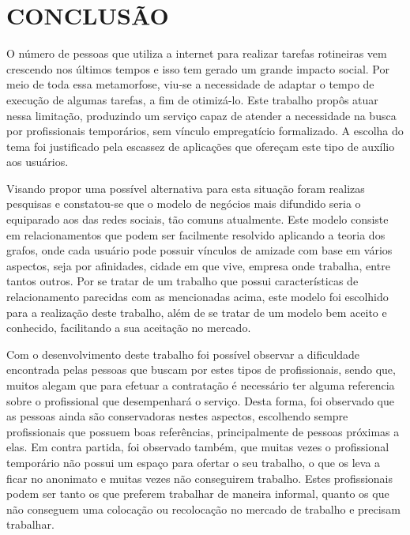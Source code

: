 \chapter{CONCLUSÃO} 


\par O número de pessoas que utiliza a internet para realizar tarefas rotineiras vem crescendo nos últimos tempos e isso tem gerado um grande impacto social. Por meio de toda essa metamorfose, viu-se a necessidade de adaptar o tempo de execução de algumas tarefas, a fim de otimizá-lo.  Este trabalho propôs atuar nessa limitação, produzindo um serviço capaz de atender a necessidade na busca por profissionais temporários, sem vínculo empregatício formalizado. A escolha do tema foi justificado pela escassez de aplicações que ofereçam este tipo de auxílio aos usuários.

\par Visando propor uma possível alternativa para esta situação foram realizas pesquisas e constatou-se que o modelo de negócios mais difundido seria o equiparado aos das redes sociais, tão comuns atualmente. Este modelo consiste em relacionamentos que podem ser facilmente resolvido aplicando a teoria dos grafos, onde cada usuário pode possuir vínculos de amizade com base em vários aspectos, seja por afinidades, cidade em que vive, empresa onde trabalha, entre tantos outros. Por se tratar de um trabalho que possui características de relacionamento parecidas com as mencionadas acima, este modelo foi escolhido para a realização deste trabalho, além de se tratar de um modelo bem aceito e conhecido, facilitando a sua aceitação no mercado.

\par Com o desenvolvimento deste trabalho foi possível observar a dificuldade encontrada pelas pessoas que buscam por estes tipos de profissionais, sendo que, muitos alegam que para efetuar a contratação é necessário ter alguma referencia sobre o profissional que desempenhará o serviço. Desta forma, foi observado que as pessoas ainda são conservadoras nestes aspectos, escolhendo sempre profissionais que possuem boas referências, principalmente de pessoas próximas a elas. Em contra partida, foi observado também, que muitas vezes o profissional temporário não possui um espaço para ofertar o seu trabalho, o que os leva a ficar no anonimato e muitas vezes não conseguirem trabalho. Estes profissionais podem ser tanto os que preferem trabalhar de maneira informal, quanto os que não conseguem uma colocação ou recolocação no mercado de trabalho e precisam trabalhar.

